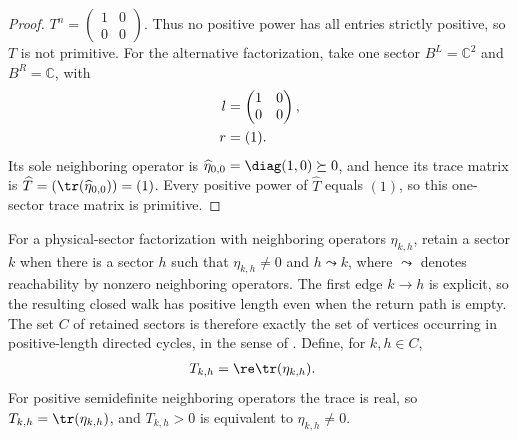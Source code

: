 \begin{proof}
    $T^n=\begin{pmatrix}1&0\\0&0\end{pmatrix}$.
    Thus no positive power has all entries strictly positive, so $T$ is not
    primitive. For the alternative factorization, take one sector
    $B^L=\mathbb C^2$ and $B^R=\mathbb C$, with
    \begin{align}
        l & =\begin{pmatrix}1&0\\0&0\end{pmatrix},
        \notag                                     \\
        r & =(1).
        \notag
    \end{align}
    Its sole neighboring operator is
    $\widehat\eta_{0,0}=\diag(1,0)\succeq0$, and hence its trace
    matrix is $\widehat T=(\tr(\widehat\eta_{0,0}))=(1)$.
    Every positive power of $\widehat T$ equals $(1)$, so this one-sector
    trace matrix is primitive.
\end{proof}

\begin{definition}
    \label{def:mpdo_cyclic_active_sector}
    \leanok
    For a physical-sector factorization with neighboring operators
    $\eta_{k,h}$, retain a sector $k$ when there is a sector $h$ such that
    $\eta_{k,h}\ne0$ and $h\leadsto k$, where $\leadsto$ denotes reachability
    by nonzero neighboring operators.
    The first edge $k\to h$ is explicit, so the resulting closed walk has
    positive length even when the return path is empty. The set $C$ of
    retained sectors is therefore exactly the set of vertices occurring in
    positive-length directed cycles, in the sense of
    \cite[Section~III]{Beigi2012Classification}. Define, for $k,h\in C$,
    \begin{align}
        T_{k,h} & =\re\tr(\eta_{k,h}).
        \notag
    \end{align}
    For positive semidefinite neighboring operators the trace is real, so
    $T_{k,h}=\tr(\eta_{k,h})$, and $T_{k,h}>0$ is equivalent to
    $\eta_{k,h}\ne0$.
\end{definition}

